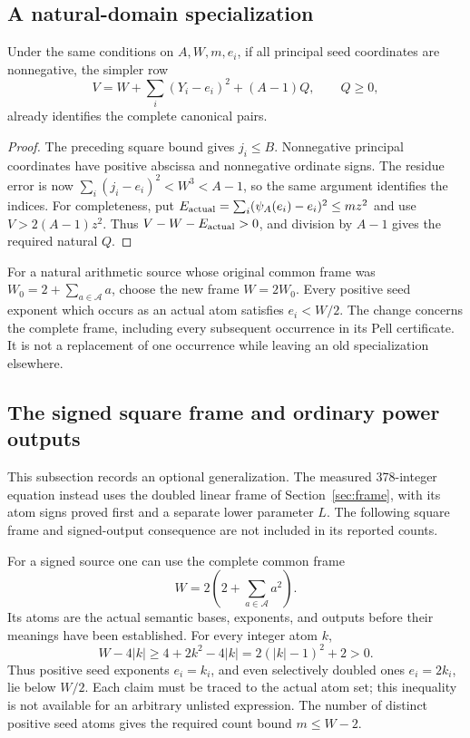 \subsection{A natural-domain specialization}

\begin{corollary}\label{cor:one-row-natural}
Under the same conditions on $A,W,m,e_i$, if all principal seed
coordinates are nonnegative, the simpler row
\begin{equation}\label{eq:one-row-natural}
 V=W+\sum_i(Y_i-e_i)^2+(A-1)Q,\qquad Q\ge0,
\end{equation}
already identifies the complete canonical pairs.
\end{corollary}
\begin{proof}
The preceding square bound gives $j_i\le B$.  Nonnegative principal
coordinates have positive abscissa and nonnegative ordinate signs.
The residue error is now $\sum_i(j_i-e_i)^2<W^3<A-1$, so the same
argument identifies the indices.  For completeness, put
$E_{\rm actual}=\sum_i(\psi_A(e_i)-e_i)^2\le m z^2$ and use
$V>2(A-1)z^2$.  Thus $V-W-E_{\rm actual}>0$, and division by $A-1$
gives the required natural $Q$.
\end{proof}

For a natural arithmetic source whose original common frame was
$W_0=2+\sum_{a\in\mathcal A}a$, choose the new frame $W=2W_0$.
Every positive seed exponent which occurs as an actual atom satisfies
$e_i<W/2$.  The change concerns the complete frame, including every
subsequent occurrence in its Pell certificate.  It is not a replacement
of one occurrence while leaving an old specialization elsewhere.

\subsection{The signed square frame and ordinary power outputs}

This subsection records an optional generalization.  The measured
378-integer equation instead uses the doubled linear frame of
Section~\ref{sec:frame}, with its atom signs proved first and a separate
lower parameter $L$.  The following square frame and signed-output
consequence are not included in its reported counts.

For a signed source one can use the complete common frame
\begin{equation}\label{eq:one-row-square-frame}
 W=2\left(2+\sum_{a\in\mathcal A}a^2\right).
\end{equation}
Its atoms are the actual semantic bases, exponents, and outputs before
their meanings have been established.  For every integer atom $k$,
\[
 W-4|k|\ge4+2k^2-4|k|=2(|k|-1)^2+2>0.
\]
Thus positive seed exponents $e_i=k_i$, and even selectively doubled
ones $e_i=2k_i$, lie below $W/2$.  Each claim must be traced to the
actual atom set; this inequality is not available for an arbitrary
unlisted expression.  The number of distinct positive seed atoms gives
the required count bound $m\le W-2$.

